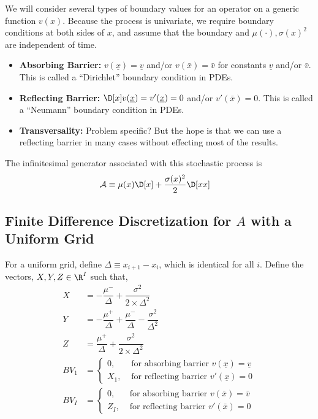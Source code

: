 \documentclass[11pt]{etk-article}
\begin{document}
We will consider several types of boundary values for an operator on a generic function $v(x)$.  Because the process is univariate, we require boundary conditions at both sides of $x$, and assume that the boundary and $\mu(\cdot), \sigma(x)^2$ are independent of time.
\begin{itemize}
	\item \textbf{Absorbing Barrier:}   $v(\underline{x}) = \underline{v}$ and/or $v(\bar{x}) = \bar{v}$ for constants $\underline{v}$ and/or $\bar{v}$.  This is called a ``Dirichlet'' boundary condition in PDEs. 
	\item \textbf{Reflecting Barrier:} $\D[x]v(\underline{x}) = v'(\underline{x})=0$ and/or $v'(\bar{x}) = 0$.  This is called a ``Neumann'' boundary condition in PDEs. 
	\item \textbf{Transversality:} Problem specific?  But the hope is that we can use a reflecting barrier in many cases without effecting most of the results.
\end{itemize}

The infinitesimal generator associated with this stochastic process is
\begin{align}
	\mathcal{A} &\equiv \mu(x)\D[x] + \frac{\sigma(x)^2}{2}\D[xx]\label{eq:A-generator-univariate-diffusion}
\end{align}

\subsection{Finite Difference Discretization for $A$ with a Uniform Grid}
For a uniform grid, define $\Delta \equiv x_{i+1} - x_i$, which is identical for all $i$.  Define the vectors, $X,Y,Z \in \R^I$ such that,
\begin{align}
	X &= - \dfrac{\mu^{-}}{\Delta} + \dfrac{\sigma^{2}}{2\times \Delta^{2}}\label{eq:X} \\
	Y &= - \dfrac{\mu^{+}}{\Delta} + \dfrac{\mu^{-}}{\Delta} - \dfrac{\sigma^{2}}{\Delta^{2}}\label{eq:Y} \\
	Z &= \dfrac{\mu^{+}}{\Delta} + \dfrac{\sigma^{2}}{2\times \Delta^{2}}\label{eq:Z}\\
	BV_1 &= \begin{cases} 0, & \text{ for absorbing barrier $v(\underline{x}) = \underline{v}$}\\
	X_1,& \text{ for reflecting barrier $v'(\underline{x}) = 0$}\end{cases}\\		
	BV_I &= \begin{cases}0 , & \text{ for absorbing barrier $v(\bar{x}) = \bar{v}$}\\
	Z_I,& \text{ for reflecting barrier $v'(\bar{x}) = 0$}\end{cases}				
\end{align}
\end{document}
